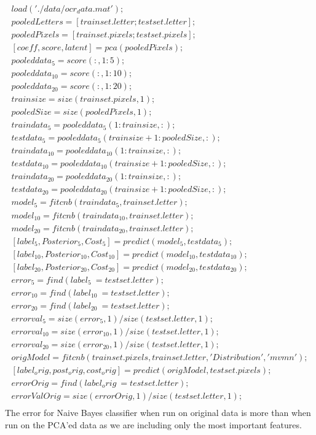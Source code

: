 \begin{enumerate}
\begin{align*}
load('./data/ocr_data.mat');  \\
pooledLetters = [trainset.letter;testset.letter]; \\
pooledPixels = [trainset.pixels;testset.pixels]; \\
[coeff,score,latent] = pca(pooledPixels); \\
pooleddata_5 = score( : , 1:5 ); \\
pooleddata_10 = score(:,1:10); \\
pooleddata_20 = score(:,1:20); \\
trainsize = size(trainset.pixels,1); \\
pooledSize = size(pooledPixels,1); \\
traindata_5 = pooleddata_5(1:trainsize,:); \\
testdata_5 = pooleddata_5(trainsize+1:pooledSize,:); \\
traindata_10 = pooleddata_10(1:trainsize,:); \\
testdata_10 = pooleddata_10(trainsize+1:pooledSize,:); \\
traindata_20 = pooleddata_20(1:trainsize,:); \\
testdata_20 = pooleddata_20(trainsize+1:pooledSize,:); \\
model_5 = fitcnb(traindata_5,trainset.letter); \\
model_10 = fitcnb(traindata_10,trainset.letter); \\
model_20 = fitcnb(traindata_20,trainset.letter); \\
[label_5,Posterior_5,Cost_5] = predict(model_5,testdata_5); \\
[label_10,Posterior_10,Cost_10] = predict(model_10,testdata_10); \\
[label_20,Posterior_20,Cost_20] = predict(model_20,testdata_20); \\
error_5 = find(label_5 ~= testset.letter); \\
error_10 = find(label_10 ~= testset.letter); \\
error_20 = find(label_20 ~= testset.letter); \\
errorval_5 = size(error_5,1)/size(testset.letter,1); \\
errorval_10 = size(error_10,1)/size(testset.letter,1); \\
errorval_20 = size(error_20,1)/size(testset.letter,1); \\
origModel = fitcnb(trainset.pixels,trainset.letter,'Distribution','mvmn'); \\
[label_orig,post_orig,cost_orig] = predict(origModel,testset.pixels); \\
errorOrig = find(label_orig ~= testset.letter); \\
errorValOrig = size(errorOrig,1)/size(testset.letter,1); \\
\end{align*}
The error for Naive Bayes classifier when run on original data is more than when run on the PCA'ed data as we are including only the most important features. \\


\end{enumerate}
